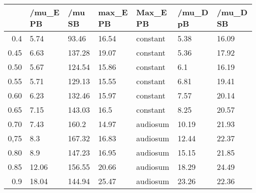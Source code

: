 \begin{table}[ht]
\centering
\begin{tabular}{rllllll}
  \hline
 & /mu\_E PB & /mu SB & max\_E PB & Max\_E PB & /mu\_D pB & /mu\_D SB \\ 
  \hline
0.4 & 5.74 & 93.46 & 16.54 & constant & 5.38 & 16.09 \\ 
  0.45 & 6.63 & 137.28 & 19.07 & constant & 5.36 & 17.92 \\ 
  0.50 & 5.67 & 124.54 & 15.86 & constant & 6.1 & 16.19 \\ 
  0.55 & 5.71 & 129.13 & 15.55 & constant & 6.81 & 19.41 \\ 
  0.60 & 6.23 & 132.46 & 15.97 & constant & 7.57 & 20.14 \\ 
  0.65 & 7.15 & 143.03 & 16.5 & constant & 8.25 & 20.57 \\ 
  0.70 & 7.43 & 160.2 & 14.97 & audiosum & 10.19 & 21.93 \\ 
  0,75 & 8.3 & 167.32 & 16.83 & audiosum & 12.44 & 22.37 \\ 
  0.80 & 8.9 & 147.23 & 16.95 & audiosum & 15.15 & 21.85 \\ 
  0.85 & 12.06 & 156.55 & 20.66 & audiosum & 18.29 & 24.49 \\ 
  0.9 & 18.04 & 144.94 & 25.47 & audiosum & 23.26 & 22.36 \\ 
   \hline
\end{tabular}
\end{table}
